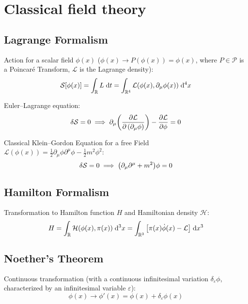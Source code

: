 \section{Classical field theory}
	\subsection{Lagrange Formalism}
		\noindent
		Action for a scalar field $\phi(x)$ (\ie $\phi(x)\to P(\phi(x))=\phi(x)$, where $P\in\mathcal{P}$ is a Poincaré Transform, $\mathcal{L}$ is the Lagrange density):
		\begin{equation}
			\mathcal{S}\qty[\phi(x)] = \int_{\mathbb{R}} L \;\dd t = \int_{\mathbb{R}^4} \mathcal{L}(\phi(x),\partial_\mu \phi(x)) \;\dd^4 x
		\end{equation}

		\noindent
		Euler--Lagrange equation:
		\begin{equation}
			\delta\mathcal{S} = 0
			\implies \partial_\mu \qty(\pdv{\mathcal{L}}{\left(\partial_\mu \phi\right)}) - \pdv{\mathcal{L}}{\phi} = 0
		\end{equation}

		\noindent
		Classical Klein--Gordon Equation for a free Field $\mathcal{L}(\phi(x)) = \frac{1}{2} \partial_\mu \phi \partial^\mu \phi - \frac{1}{2} m^2 \phi^2$:
		\begin{equation}
			\delta \mathcal{S} = 0 \implies \qty(\partial_\mu \partial^\mu + m^2)\phi = 0
		\end{equation}


	\subsection{Hamilton Formalism}
		\noindent
		Transformation to Hamilton function $H$ and Hamiltonian density $\mathcal{H}$:
		\begin{equation}
			H = \int_{\mathbb{R}} \mathcal{H}(\phi(x),\pi(x)) \;\dd^3 x = \int_{\mathbb{R}^3} \qty[\pi(x)\dot{\phi}(x) - \mathcal{L}] \;\dd x^3
		\end{equation}

	\subsection{Noether's Theorem}
		\noindent
		Continuous transformation (with a continuous infinitesimal variation $\delta_\varepsilon \phi$, characterized by an infinitesimal variable $\varepsilon$):
		\begin{equation}
			\phi(x)\to\phi'(x) = \phi(x) + \delta_\varepsilon \phi(x)
		\end{equation}

